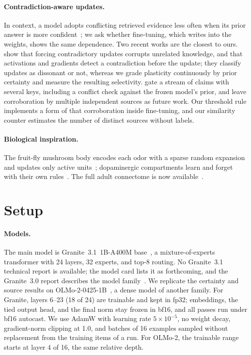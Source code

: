 \documentclass[11pt]{article}
\begin{document}
\paragraph{Contradiction-aware updates.}
In context, a model adopts conflicting retrieved evidence less often when its prior answer is more confident~\citep{wu2024clasheval}; we ask whether fine-tuning, which writes into the weights, shows the same dependence.
Two recent works are the closest to ours.
\citet{clemente2025stubbornness} show that forcing contradictory updates corrupts unrelated knowledge, and that activations and gradients detect a contradiction before the update; they classify updates as dissonant or not, whereas we grade plasticity continuously by prior certainty and measure the resulting selectivity.
\citet{metales2026surprise} gate a stream of claims with several keys, including a conflict check against the frozen model's prior, and leave corroboration by multiple independent sources as future work.
Our threshold rule implements a form of that corroboration inside fine-tuning, and our similarity counter estimates the number of distinct sources without labels.

\paragraph{Biological inspiration.}
The fruit-fly mushroom body encodes each odor with a sparse random expansion and updates only active units~\citep{dasgupta2017neural,shen2023reducing}; dopaminergic compartments learn and forget with their own rules~\citep{aso2016dopaminergic}.
The full adult connectome is now available~\citep{dorkenwald2024neuronal,schlegel2024whole}.

\section{Setup}
\label{sec:setup}

\paragraph{Models.}
The main model is Granite~3.1~1B-A400M base~\citep{granite31card}, a mixture-of-experts transformer with 24 layers, 32 experts, and top-8 routing. No Granite~3.1 technical report is available; the model card lists it as forthcoming, and the Granite~3.0 report describes the model family~\citep{granite2024granite}.
We replicate the certainty and source results on OLMo-2-0425-1B~\citep{olmo2025olmo2}, a dense model of another family.
For Granite, layers 6--23 (18 of 24) are trainable and kept in fp32; embeddings, the tied output head, and the final norm stay frozen in bf16, and all passes run under bf16 autocast.
We use AdamW with learning rate $5\times10^{-5}$, no weight decay, gradient-norm clipping at 1.0, and batches of 16 examples sampled without replacement from the training items of a run.
For OLMo-2, the trainable range starts at layer 4 of 16, the same relative depth.
\end{document}
